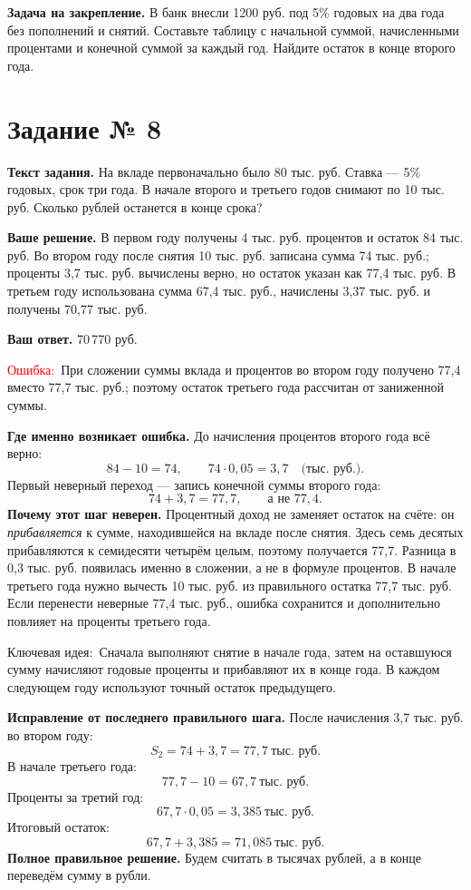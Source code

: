 \documentclass[12pt,a4paper]{article}
\newcommand{\err}{\textcolor{red}{Ошибка:}}
\newcommand{\idea}{\textcolor{blue!60!black}{Ключевая идея:}}
\begin{document}
\textbf{Задача на закрепление.} В банк внесли 1200 руб. под 5\% годовых на два года без пополнений и снятий. Составьте таблицу с начальной суммой, начисленными процентами и конечной суммой за каждый год. Найдите остаток в конце второго года.
\newpage
{}\label{task:8}
\section*{Задание № 8}
\textbf{Текст задания.} На вкладе первоначально было 80 тыс. руб. Ставка --- 5\% годовых, срок три года. В начале второго и третьего годов снимают по 10 тыс. руб. Сколько рублей останется в конце срока?

\textbf{Ваше решение.} В первом году получены 4 тыс. руб. процентов и остаток 84 тыс. руб. Во втором году после снятия 10 тыс. руб. записана сумма 74 тыс. руб.; проценты 3,7 тыс. руб. вычислены верно, но остаток указан как 77,4 тыс. руб. В третьем году использована сумма 67,4 тыс. руб., начислены 3,37 тыс. руб. и получены 70,77 тыс. руб.

\textbf{Ваш ответ.} 70\,770 руб.

\err\ При сложении суммы вклада и процентов во втором году получено 77,4 вместо 77,7 тыс. руб.; поэтому остаток третьего года рассчитан от заниженной суммы.

\textbf{Где именно возникает ошибка.} До начисления процентов второго года всё верно:
\[
84-10=74,\qquad 74\cdot0{,}05=3{,}7
\quad\text{(тыс. руб.).}
\]
Первый неверный переход --- запись конечной суммы второго года:
\[
74+3{,}7=\boxed{77{,}7},\qquad\text{а не }77{,}4.
\]
\textbf{Почему этот шаг неверен.} Процентный доход не заменяет остаток на счёте: он \emph{прибавляется} к сумме, находившейся на вкладе после снятия. Здесь семь десятых прибавляются к семидесяти четырём целым, поэтому получается 77,7. Разница в 0,3 тыс. руб. появилась именно в сложении, а не в формуле процентов. В начале третьего года нужно вычесть 10 тыс. руб. из правильного остатка 77,7 тыс. руб. Если перенести неверные 77,4 тыс. руб., ошибка сохранится и дополнительно повлияет на проценты третьего года.

\idea\ Сначала выполняют снятие в начале года, затем на оставшуюся сумму начисляют годовые проценты и прибавляют их в конце года. В каждом следующем году используют точный остаток предыдущего.

\textbf{Исправление от последнего правильного шага.} После начисления 3,7 тыс. руб. во втором году:
\[
S_2=74+3{,}7=77{,}7\ \text{тыс. руб.}
\]
В начале третьего года:
\[
77{,}7-10=67{,}7\ \text{тыс. руб.}
\]
Проценты за третий год:
\[
67{,}7\cdot0{,}05=3{,}385\ \text{тыс. руб.}
\]
Итоговый остаток:
\[
67{,}7+3{,}385=71{,}085\ \text{тыс. руб.}
\]
\textbf{Полное правильное решение.} Будем считать в тысячах рублей, а в конце переведём сумму в рубли.
\end{document}
